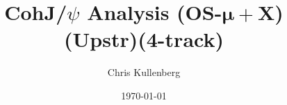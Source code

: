 \title{CohJ/$\psi$ Analysis (\textbf{OS}-$\boldsymbol{\mu+}$\textbf{X})(\textbf{Upstr})(\textbf{4-track})}
\author{Chris Kullenberg}
\date{\today}
